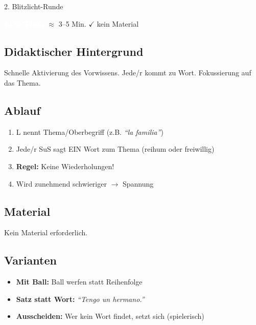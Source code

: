 \documentclass[11pt, a4paper]{article}
\newcommand{\tagEinstieg}{\colorbox{einstieg}{\textcolor{white}{\footnotesize\textbf{EINSTIEG}}}}
\newcommand{\zeit}[1]{\textcolor{grau}{\footnotesize $\approx$ #1 Min.}}
\newcommand{\matKeine}{\textcolor{erfolg}{$\checkmark$ kein Material}}
\begin{document}
\begin{methode}{2. Blitzlicht-Runde}

\tagEinstieg{} \zeit{3--5} \hfill \matKeine

\subsection*{Didaktischer Hintergrund}
Schnelle Aktivierung des Vorwissens. Jede/r kommt zu Wort. Fokussierung auf das Thema.

\subsection*{Ablauf}
\begin{enumerate}[leftmargin=*]
    \item L nennt Thema/Oberbegriff (z.B. \textit{``la familia''})
    \item Jede/r SuS sagt EIN Wort zum Thema (reihum oder freiwillig)
    \item \textbf{Regel:} Keine Wiederholungen!
    \item Wird zunehmend schwieriger $\rightarrow$ Spannung
\end{enumerate}

\subsection*{Material}
\begin{materialbox}
Kein Material erforderlich.
\end{materialbox}

\subsection*{Varianten}
\begin{itemize}[leftmargin=*]
    \item \textbf{Mit Ball:} Ball werfen statt Reihenfolge
    \item \textbf{Satz statt Wort:} \textit{``Tengo un hermano.''}
    \item \textbf{Ausscheiden:} Wer kein Wort findet, setzt sich (spielerisch)
\end{itemize}

\end{methode}

\vspace{1em}
\end{document}
